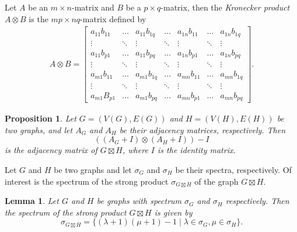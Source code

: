 \documentclass[12pt]{article}
\theoremstyle{plain}
\newtheorem{lemma}[theorem]{Lemma}
\newtheorem{proposition}[theorem]{Proposition}
\theoremstyle{definition}
\theoremstyle{remark}
\begin{document}
 
    Let $A$ be an $m\times n$-matrix and $B$ be a $p\times q$-matrix, then the \textit{Kronecker product} $A\otimes B$ is the $mp\times nq$-matrix defined by
    \begin{align*}
        A\otimes B = \begin{bmatrix}
            a_{11}b_{11} & \dots & a_{11}b_{1q} & \dots & a_{1n}b_{11}& \dots & a_{1n}b_{1q}\\
            \vdots & \ddots & \vdots & \ddots & \vdots & \ddots & \vdots \\
            a_{11}b_{p1} & \dots & a_{11}b_{pq} & \dots & a_{1n}b_{p1}& \dots & a_{1n}b_{pq}\\
            \vdots & \ddots & \vdots & \ddots & \vdots & \ddots & \vdots \\
            a_{m1}b_{11} & \dots & a_{m1}b_{1q} & \dots & a_{mn}b_{11}& \dots & a_{mn}b_{1q}\\
            \vdots & \ddots & \vdots & \ddots & \vdots & \ddots & \vdots \\
            a_{m1}B_{p1} & \dots & a_{m1}b_{pq} & \dots & a_{mn}b_{p1} & \dots & a_{mn}b_{pq}
        \end{bmatrix}.
    \end{align*}



\begin{proposition}\cite{adjacnecy-matrix-strong-product}
    Let $G=(V(G),E(G))$ and $H=(V(H),E(H))$ be two graphs, and let $A_G$ and $A_H$ be their adjacency matrices, respectively. Then
    \begin{equation*}
        ((A_G+I)\otimes (A_H+I))-I
    \end{equation*}
    is the adjacency matrix of $G\boxtimes H$, where $I$ is the identity matrix.
    \label{prop:adjacency-matrix-strong-product}
\end{proposition}

Let $G$ and $H$ be two graphs and let $\sigma_G$ and $\sigma_H$ be their spectra, respectively. Of interest is the spectrum of the strong product $\sigma_{G\boxtimes H}$ of the graph $G\boxtimes H$.


\begin{lemma}\cite{adjacnecy-matrix-strong-product}
Let $G$ and $H$ be graphs with spectrum $\sigma_G$ and $\sigma_H$ respectively. Then the spectrum of the strong product $G\boxtimes H$ is given by
    \begin{equation*}
        \sigma_{G\boxtimes H}=\{(\lambda+1)(\mu+1)-1 \mid \lambda \in \sigma_G, \mu \in \sigma_H\}.
    \end{equation*}
    \label{lemma:spectrum-strong-product}
\end{lemma}
\vspace{-1.1cm}
\end{document}

